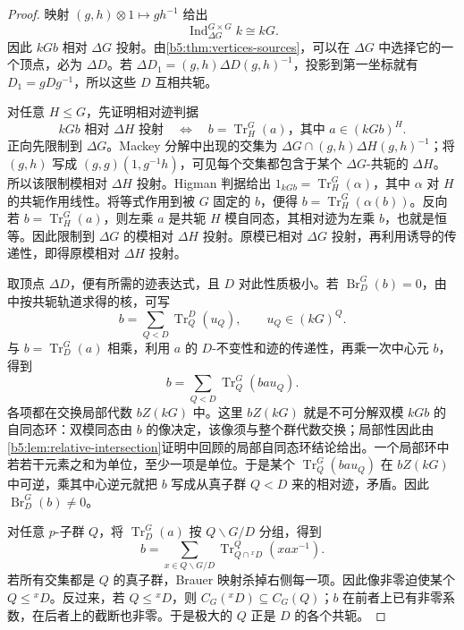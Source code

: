 \begin{proof}
	映射 \((g,h)\otimes1\mapsto gh^{-1}\) 给出
	\[
		\operatorname{Ind}_{\Delta G}^{G\times G}k\cong kG.
	\]
	因此 \(kGb\) 相对 \(\Delta G\) 投射。由\cref{b5:thm:vertices-sources}，可以在 \(\Delta G\) 中选择它的一个顶点，必为 \(\Delta D\)。若 \(\Delta D_1=(g,h)\Delta D(g,h)^{-1}\)，投影到第一坐标就有 \(D_1=gDg^{-1}\)，所以这些 \(D\) 互相共轭。

	对任意 \(H\le G\)，先证明相对迹判据
	\[
		kGb\text{ 相对 }\Delta H\text{ 投射}
		\quad\Longleftrightarrow\quad
		b=\operatorname{Tr}_H^G(a)\text{，其中 }a\in(kGb)^H.
	\]
	正向先限制到 \(\Delta G\)。Mackey 分解中出现的交集为 \(\Delta G\cap(g,h)\Delta H(g,h)^{-1}\)；将 \((g,h)\) 写成 \((g,g)(1,g^{-1}h)\)，可见每个交集都包含于某个 \(\Delta G\)-共轭的 \(\Delta H\)。所以该限制模相对 \(\Delta H\) 投射。Higman 判据给出 \(1_{kGb}=\operatorname{Tr}_H^G(\alpha)\)，其中 \(\alpha\) 对 \(H\) 的共轭作用线性。将等式作用到被 \(G\) 固定的 \(b\)，便得 \(b=\operatorname{Tr}_H^G(\alpha(b))\)。反向若 \(b=\operatorname{Tr}_H^G(a)\)，则左乘 \(a\) 是共轭 \(H\) 模自同态，其相对迹为左乘 \(b\)，也就是恒等。因此限制到 \(\Delta G\) 的模相对 \(\Delta H\) 投射。原模已相对 \(\Delta G\) 投射，再利用诱导的传递性，即得原模相对 \(\Delta H\) 投射。

	取顶点 \(\Delta D\)，便有所需的迹表达式，且 \(D\) 对此性质极小。若 \(\operatorname{Br}_D^G(b)=0\)，由中按共轭轨道求得的核，可写
	\[
		b=\sum_{Q<D}\operatorname{Tr}_Q^D(u_Q),\qquad u_Q\in(kG)^Q.
	\]
	与 \(b=\operatorname{Tr}_D^G(a)\) 相乘，利用 \(a\) 的 \(D\)-不变性和迹的传递性，再乘一次中心元 \(b\)，得到
	\[
		b=\sum_{Q<D}\operatorname{Tr}_Q^G(ba u_Q).
	\]
	各项都在交换局部代数 \(bZ(kG)\) 中。这里 \(bZ(kG)\) 就是不可分解双模 \(kGb\) 的自同态环：双模同态由 \(b\) 的像决定，该像须与整个群代数交换；局部性因此由\cref{b5:lem:relative-intersection}证明中回顾的局部自同态环结论给出。一个局部环中若若干元素之和为单位，至少一项是单位。于是某个 \(\operatorname{Tr}_Q^G(ba u_Q)\) 在 \(bZ(kG)\) 中可逆，乘其中心逆元就把 \(b\) 写成从真子群 \(Q<D\) 来的相对迹，矛盾。因此 \(\operatorname{Br}_D^G(b)\ne0\)。

	对任意 \(p\)-子群 \(Q\)，将 \(\operatorname{Tr}_D^G(a)\) 按 \(Q\backslash G/D\) 分组，得到
	\[
		b=\sum_{x\in Q\backslash G/D}
		\operatorname{Tr}_{Q\cap{}^xD}^{Q}(xax^{-1}).
	\]
	若所有交集都是 \(Q\) 的真子群，Brauer 映射杀掉右侧每一项。因此像非零迫使某个 \(Q\le{}^xD\)。反过来，若 \(Q\le{}^xD\)，则 \(C_G({}^xD)\subseteq C_G(Q)\)；\(b\) 在前者上已有非零系数，在后者上的截断也非零。于是极大的 \(Q\) 正是 \(D\) 的各个共轭。
\end{proof}

